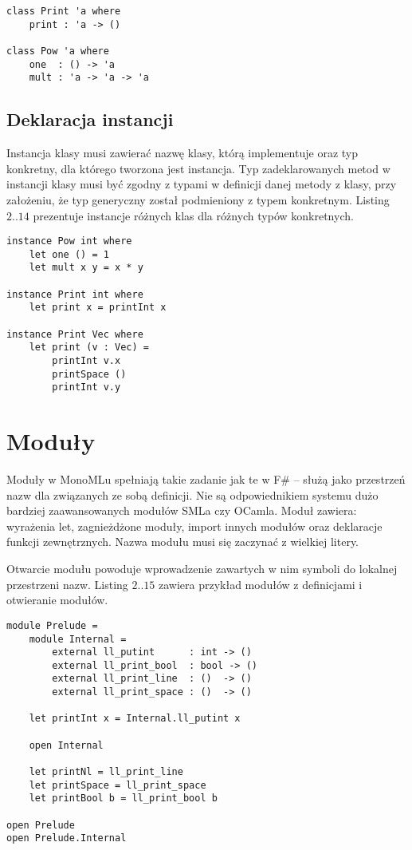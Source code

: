 \documentclass[declaration,shortabstract]{iithesis}
\begin{document}
\begin{lstlisting}[frame=single, caption=Deklaracja klasy.]
class Print 'a where 
    print : 'a -> ()
  
class Pow 'a where 
    one  : () -> 'a
    mult : 'a -> 'a -> 'a
\end{lstlisting}

\subsection{Deklaracja instancji}

Instancja klasy musi zawierać nazwę klasy, którą implementuje oraz typ konkretny,
dla którego tworzona jest instancja. Typ zadeklarowanych metod w
instancji klasy musi być zgodny z typami w definicji danej metody z klasy,
przy założeniu, że typ generyczny został podmieniony z typem konkretnym. 
Listing $2..14$ prezentuje instancje różnych klas dla różnych typów konkretnych.

\begin{lstlisting}[frame=single, caption=Instancja klasy.]
instance Pow int where
    let one () = 1 
    let mult x y = x * y

instance Print int where 
    let print x = printInt x 

instance Print Vec where 
    let print (v : Vec) = 
        printInt v.x 
        printSpace ()
        printInt v.y
\end{lstlisting}

\section{Moduły}

Moduły w MonoMLu spełniają takie zadanie jak te w F\# -- służą jako 
przestrzeń nazw dla związanych ze sobą definicji. Nie są odpowiednikiem 
systemu dużo bardziej zaawansowanych modułów SMLa czy OCamla.
Moduł zawiera: wyrażenia let, zagnieżdżone moduły, import innych 
modułów oraz deklaracje funkcji zewnętrznych. Nazwa modułu musi się zaczynać 
z wielkiej litery. 

Otwarcie modułu powoduje wprowadzenie zawartych w nim symboli do 
lokalnej przestrzeni nazw. Listing $2..15$ zawiera przykład modułów z definicjami 
i otwieranie modułów.

\begin{lstlisting}[frame=single, caption=Tworzenie i importowanie modułów.]
module Prelude = 
    module Internal = 
        external ll_putint      : int -> () 
        external ll_print_bool  : bool -> () 
        external ll_print_line  : ()  -> () 
        external ll_print_space : ()  -> () 

    let printInt x = Internal.ll_putint x

    open Internal 
    
    let printNl = ll_print_line
    let printSpace = ll_print_space
    let printBool b = ll_print_bool b

open Prelude
open Prelude.Internal
\end{lstlisting}
\end{document}
